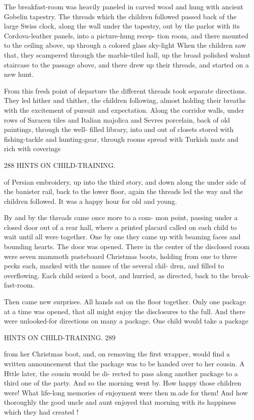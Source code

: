 \documentclass[
]{book}
\begin{document}
The breakfast-room was heavily paneled in carved wood and hung with ancient Gobelin tapestry. The threads which the children followed passed back of the large Swiss clock, along the wall under the tapestry, out by the parlor with its Cordova-leather panels, into a picture-hung recep- tion room, and there mounted to the ceiling above, up through a colored glass sky-light When the children saw that, they scampered through the marble-tiled hall, up the broad polished walnut staircase to the passage above, and there drew up their threads, and started on a new hunt.

From this fresh point of departure the different threads took separate directions. They led hither and thither, the children following, almost holding their breaths with the excitement of pursuit and expectation. Along the corridor walls, under rows of Saracen tiles and Italian majolica and Sevres porcelain, back of old paintings, through the well- filled library, into and out of closets stored with fishing-tackle and hunting-gear, through rooms spread with Turkish mats and rich with coverings

288 HINTS ON CHILD-TRAINING.

of Persian embroidery, up into the third story, and down along the under side of the banister rail, back to the lower floor, again the threads led the way and the children followed. It was a happy hour for old and young.

By and by the threads came once more to a com- mon point, passing under a closed door out of a rear hall, where a printed placard called on each child to wait until all were together. One by one they came up with beaming faces and bounding hearts. The door was opened. There in the center of the disclosed room were seven mammoth pasteboard Christmas boots, holding from one to three pecks each, marked with the names of the several chil- dren, and filled to overflowing. Each child seized a boot, and hurried, as directed, back to the break- fast-room.

Then came new surprises. All hands sat on the floor together. Only one package at a time was opened, that all might enjoy the disclosures to the full. And there were unlooked-for directions on many a package. One child would take a package

HINTS ON CHILD-TRAINING. 289

from her Christmas boot, and, on removing the first wrapper, would find a written announcement that the package was to be handed over to her cousin. A Httle later, the cousin would be di- rected to pass along another package to a third one of the party. And so the morning went by. How happy those children were! What life-long memories of enjoyment were then m.ade for them! And how thoroughly the good uncle and aunt enjoyed that morning with its happiness which they had created !
\end{document}
